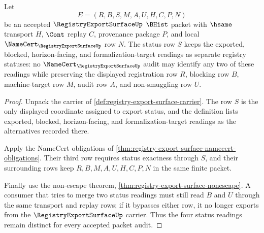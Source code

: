\begin{theorem}
\label{thm:registry-export-surface-status-exactness}
Let
$$
E=(R,B,S,M,A,U,H,C,P,N)
$$
be an accepted $\RegistryExportSurfaceUp$ $\BHist$ packet with $\hsame$ transport $H$, $\Cont$ replay $C$, provenance package $P$, and local $\NameCert_{\RegistryExportSurfaceUp}$ row $N$. The status row $S$ keeps the exported, blocked, horizon-facing, and formalization-target readings as separate registry statuses: no $\NameCert_{\RegistryExportSurfaceUp}$ audit may identify any two of these readings while preserving the displayed registration row $R$, blocking row $B$, machine-target row $M$, audit row $A$, and non-smuggling row $U$.
\end{theorem}
\begin{proof}
Unpack the carrier of \autoref{def:registry-export-surface-carrier}. The row $S$ is the only displayed coordinate assigned to export status, and the definition lists exported, blocked, horizon-facing, and formalization-target readings as the alternatives recorded there.

Apply the NameCert obligations of \autoref{thm:registry-export-surface-namecert-obligations}. Their third row requires status exactness through $S$, and their surrounding rows keep $R,B,M,A,U,H,C,P,N$ in the same finite packet.

Finally use the non-escape theorem, \autoref{thm:registry-export-surface-nonescape}. A consumer that tries to merge two status readings must still read $B$ and $U$ through the same transport and replay rows; if it bypasses either row, it no longer exports from the $\RegistryExportSurfaceUp$ carrier. Thus the four status readings remain distinct for every accepted packet audit.
\end{proof}

